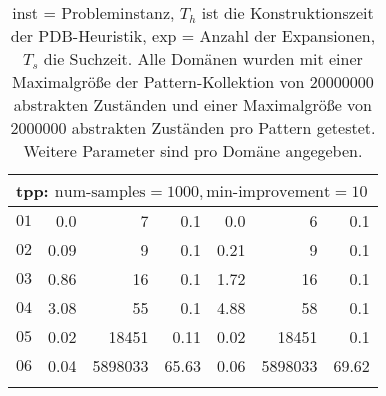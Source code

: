 \begin{longtable}{|c||r|r|r||r|r|r|}
\multicolumn{7}{|l|}{tpp: $\text{num-samples}=1000,\text{min-improvement}=10$}\\\hline
$01$ & 0.0 & 7 & 0.1 &0.0 & 6 & 0.1 \\\hline
$02$ & 0.09 & 9 & 0.1 &0.21 & 9 & 0.1 \\\hline
$03$ & 0.86 & 16 & 0.1 &1.72 & 16 & 0.1 \\\hline
$04$ & 3.08 & 55 & 0.1 &4.88 & 58 & 0.1 \\\hline
$05$ & 0.02 & 18451 & 0.11 &0.02 & 18451 & 0.1 \\\hline
$06$ & 0.04 & 5898033 & 65.63 &0.06 & 5898033 & 69.62 \\\hline

\caption{inst = Probleminstanz, $T_h$ ist die Konstruktionszeit der PDB-Heuristik, exp = Anzahl der Expansionen, $T_s$
die Suchzeit. Alle Domänen wurden mit einer Maximalgröße der Pattern-Kollektion von $20000000$ abstrakten Zuständen und 
einer Maximalgröße von $2000000$ abstrakten Zuständen pro Pattern getestet. Weitere Parameter sind pro Domäne angegeben.}
\end{longtable}